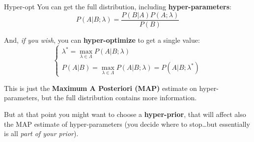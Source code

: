 \documentclass[9pt]{beamer}
\begin{document}
\begin{frame}{Hyper-opt}
    You can get the full distribution, including \textbf{hyper-parameters}:
    \begin{equation*}
        P(A|B;\lambda) = \frac{P(B|A) P(A;\lambda)}{P(B)}
    \end{equation*}

    And, \textit{if you wish}, you can \alert{\textbf{hyper-optimize}} to get a
    single value:
    \begin{equation*}
        \begin{cases}
            \lambda^* = \max_{\lambda \in \Lambda} P(A|B;\lambda)\\
            P(A|B) = \max_{\lambda \in \Lambda} P(A|B;\lambda) = P(A|B; \lambda^*)
        \end{cases}
    \end{equation*}
    
    This is just the \textbf{Maximum A Posteriori (MAP)} estimate on
    hyper-parameters, but the full distribution contains more information.

    But at that point you might want to choose a \textbf{hyper-prior}, that
    will affect also the MAP estimate of hyper-parameters (you decide where to
    stop\dots but essentially is all \textit{part of your prior}).
\end{frame}
\end{document}
